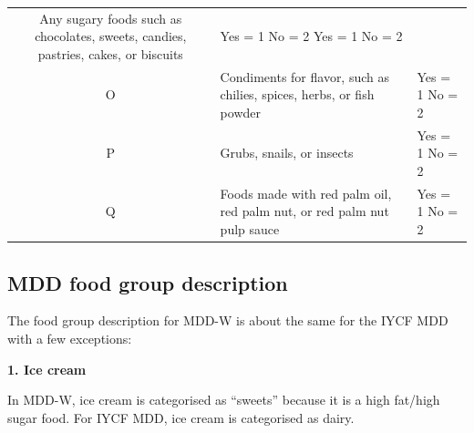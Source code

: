 \documentclass[12pt,]{book}
\theoremstyle{definition}
\theoremstyle{definition}
\theoremstyle{definition}
\theoremstyle{remark}
\begin{document}
\begin{longtable}[]{@{}cll@{}}
\begin{minipage}[t]{0.68\columnwidth}
Any sugary foods such as chocolates, sweets, candies, pastries, cakes,
or biscuits\strut
\end{minipage} & \begin{minipage}[t]{0.18\columnwidth}\raggedright
Yes = 1 No = 2 Yes = 1 No = 2\strut
\end{minipage}\tabularnewline
\begin{minipage}[t]{0.06\columnwidth}\centering
O\strut
\end{minipage} & \begin{minipage}[t]{0.68\columnwidth}\raggedright
Condiments for flavor, such as chilies, spices, herbs, or fish
powder\strut
\end{minipage} & \begin{minipage}[t]{0.18\columnwidth}\raggedright
Yes = 1 No = 2\strut
\end{minipage}\tabularnewline
\begin{minipage}[t]{0.06\columnwidth}\centering
P\strut
\end{minipage} & \begin{minipage}[t]{0.68\columnwidth}\raggedright
Grubs, snails, or insects\strut
\end{minipage} & \begin{minipage}[t]{0.18\columnwidth}\raggedright
Yes = 1 No = 2\strut
\end{minipage}\tabularnewline
\begin{minipage}[t]{0.06\columnwidth}\centering
Q\strut
\end{minipage} & \begin{minipage}[t]{0.68\columnwidth}\raggedright
Foods made with red palm oil, red palm nut, or red palm nut pulp
sauce\strut
\end{minipage} & \begin{minipage}[t]{0.18\columnwidth}\raggedright
Yes = 1 No = 2\strut
\end{minipage}\tabularnewline
\bottomrule
\end{longtable}

\hypertarget{mdd-food-group-description}{%
\subsection{MDD food group
description}\label{mdd-food-group-description}}

The food group description for MDD-W is about the same for the IYCF MDD
with a few exceptions:

\textbf{1. Ice cream}

In MDD-W, ice cream is categorised as ``sweets'' because it is a high
fat/high sugar food. For IYCF MDD, ice cream is categorised as dairy.
\end{document}

